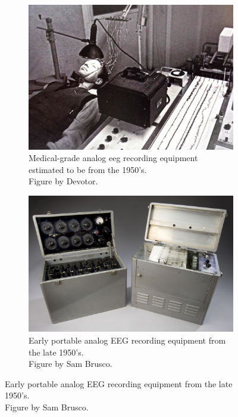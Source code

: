 \begin{figure}[ht]
\begin{minipage}{\textwidth}
    \hfill
    \begin{subfigure}{.48\textwidth}
        \centering
        \includegraphics[width=\textwidth]{images/hardware/eeg_1950.jpg}
        \captionsetup{width=0.9\linewidth}
        \captionsetup{justification=centering}
        \caption{Medical-grade analog \gls{eeg} recording equipment estimated to be from the 1950's. \\Figure by Devotor\footnotemark[1].}
        \label{fig:eeg_hardware_evolution_2}
    \end{subfigure}
    \captionsetup{width=0.9\linewidth}
    \bigskip
    \begin{subfigure}{.48\textwidth}
        \centering
        \includegraphics[width=\textwidth]{images/hardware/early_portable_eeg.jpg}
        \captionsetup{width=0.9\linewidth}
        \captionsetup{justification=centering}
        \caption{Early portable analog EEG recording equipment from the late 1950's. \\Figure by Sam Brusco\footnotemark[2]. }

\end{subfigure}
\end{minipage}
\end{figure}
